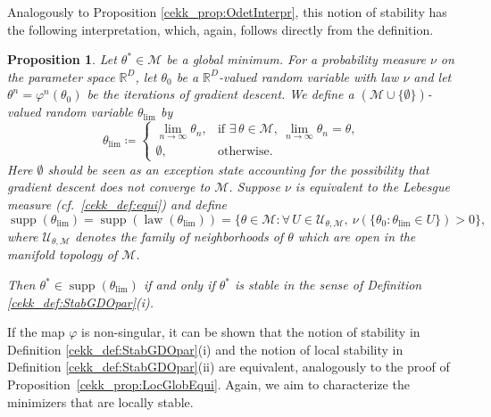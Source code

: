 \documentclass[10pt]{article}
\newcommand{\R}{{\mathbb R}}
\def\R{\mathbb{R}}
\newtheorem{proposition}[theorem]{Proposition}
\begin{document}
Analogously to Proposition \ref{cekk_prop:OdetInterpr}, this notion of stability has the following interpretation, which, again, follows directly from the definition.
\begin{proposition} \label{cekk_prop:OparInterpr}
	Let $\theta^* \in \mathcal M$ be a global minimum.
	For a probability measure $\nu$ on the parameter space $\R^D$, let $\theta_0$ be a $\R^D$-valued random variable with law $\nu$ and let $\theta^n = \varphi^n(\theta_0)$ be the iterations of gradient descent. We define a $(\mathcal M \cup \{\emptyset\})$-valued random variable $\theta_{\lim}$ by
	\begin{equation}\label{cekk_eq:thetaLim}
		\theta_{\lim} \coloneqq \begin{cases} \lim_{n \to \infty} \theta_n,&\text{if }\exists\, \theta \in \mathcal M, ~\lim_{n \to \infty} \theta_n = \theta,\\
			\emptyset,& \text{otherwise}.
		\end{cases}
	\end{equation}
	Here $\emptyset$ should be seen as an exception state accounting for the possibility that gradient descent does not converge to $\mathcal M$.
	Suppose $\nu$ is equivalent to the Lebesgue measure (cf.~\eqref{cekk_def:equi}) and define
	$$\operatorname{supp}(\theta_{\lim}) = \operatorname{supp}(\operatorname{law}(\theta_{\lim})) = \{\theta \in \mathcal M: \forall\, U \in \mathcal U_{\theta, \mathcal M},~ \nu(\{\theta_0 : \theta_{\lim} \in U\}) > 0\},$$
	where $\mathcal U_{\theta, \mathcal M}$ denotes the family of neighborhoods of $\theta$ which are open in the manifold topology of $\mathcal M$.
	
	Then $\theta^* \in \operatorname{supp}(\theta_{\lim})$ if and only if $\theta^*$ is stable in the sense of Definition \ref{cekk_def:StabGDOpar}(i).
\end{proposition}
If the map $\varphi$ is non-singular, it can be shown that the notion of stability in Definition \ref{cekk_def:StabGDOpar}(i) and the notion of local stability in Definition \ref{cekk_def:StabGDOpar}(ii) are equivalent, analogously to the proof of Proposition~\ref{cekk_prop:LocGlobEqui}. Again, we aim to characterize the minimizers that are locally stable.
\end{document}
